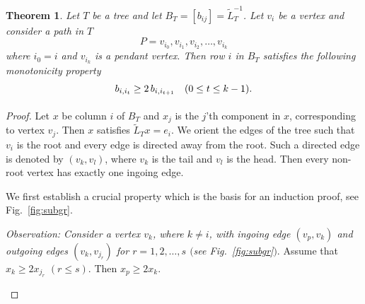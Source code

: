 \documentclass[12pt]{article}
\newtheorem{theorem}{Theorem}[section]
\begin{document}
\begin{theorem}
 \label{thm:tree_B_monotone}
  Let $T$ be a tree and let $B_T=[b_{ij}]=\tilde{L}_T^{-1}$. Let $v_i$ be a vertex and consider a path in $T$
  \[
    P=v_{i_0}, v_{i_1}, v_{i_2}, \ldots, v_{i_k}
  \]
  where $i_0=i$ and $v_{i_k}$ is a pendant vertex. Then row $i$ in $B_T$ 
   satisfies the following monotonicity property
  \begin{equation}
 \label{eq:tree-d-mon}
 \begin{array}{cl} \vspace{0.1cm}
     b_{i,i_t} \ge 2 \,b_{i,i_{t+1}}   &(0\le t\le k-1). 
 \end{array}    
 \end{equation}
\end{theorem}
%
\begin{proof}
 Let $x$ be column $i$ of $B_T$ and $x_j$ is the $j$'th component in $x$,  corresponding to vertex $v_j$. Then $x$ satisfies $\tilde{L}_Tx=e_i$. We  orient the edges of the tree such that $v_i$ is the root and every edge is directed away from the root. Such a directed edge is denoted by $(v_k,v_l)$, where $v_k$ is the tail and $v_l$ is the head. Then every non-root vertex has exactly one ingoing edge.
 
 We first establish a crucial property which is the basis for an induction proof, see Fig.~\ref{fig:subgr}. 
 
\smallskip
 {\em Observation:  Consider a vertex $v_k$, where $k\not=i$, with ingoing edge $(v_p,v_k)$ and outgoing edges 
 $(v_k,v_{j_r})$ for $r=1, 2, \ldots, s$ $($see Fig.~\ref{fig:subgr}$)$}.  Assume that $x_k \ge 2 x_{j_r}$ $(r \le s)$. Then $x_p \ge 2x_k$.
 
\begin{figure}

\centering
{}
\end{figure}
\end{proof}
\end{document}

